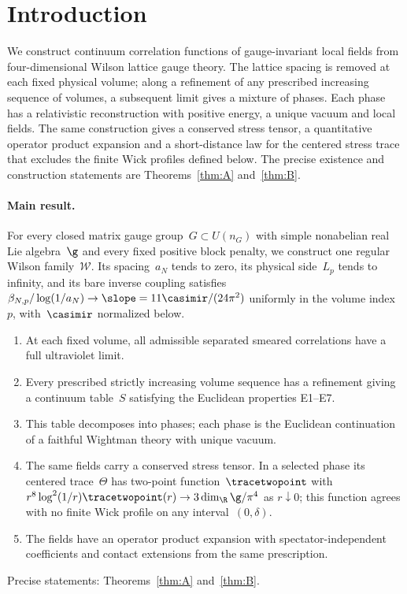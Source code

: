 \section{Introduction}\label{sec:introduction}

We construct continuum correlation functions of gauge-invariant local fields from four-dimensional Wilson lattice gauge theory. The lattice spacing is removed at each fixed physical volume; along a refinement of any prescribed increasing sequence of volumes, a subsequent limit gives a mixture of phases. Each phase has a relativistic reconstruction with positive energy, a unique vacuum and local fields. The same construction gives a conserved stress tensor, a quantitative operator product expansion and a short-distance law for the centered stress trace that excludes the finite Wick profiles defined below. The precise existence and construction statements are Theorems~\ref{thm:A} and~\ref{thm:B}.

\paragraph{Main result.}
For every closed matrix gauge group~$G\subset U(n_G)$ with simple nonabelian real Lie algebra~$\g$ and every fixed positive block penalty, we construct one regular Wilson family~$\mathcal W$. Its spacing~$a_N$ tends to zero, its physical side~$L_p$ tends to infinity, and its bare inverse coupling satisfies $\beta_{N,p}/\log(1/a_N)\to\slope=11\casimir/(24\pi^2)$ uniformly in the volume index~$p$, with~$\casimir$ normalized below.
\begin{enumerate}[label=\textup{(\roman*)},nosep]
\item At each fixed volume, all admissible separated smeared correlations have a full ultraviolet limit.
\item Every prescribed strictly increasing volume sequence has a refinement giving a continuum table~$S$ satisfying the Euclidean properties E1--E7.
\item This table decomposes into phases; each phase is the Euclidean continuation of a faithful Wightman theory with unique vacuum.
\item The same fields carry a conserved stress tensor. In a selected phase its centered trace~$\Theta$ has two-point function~$\tracetwopoint$ with $r^8\log^2(1/r)\tracetwopoint(r)\to3\dim_\R\g/\pi^4$ as $r\downarrow0$; this function agrees with no finite Wick profile on any interval~$(0,\delta)$.
\item The fields have an operator product expansion with spectator-independent coefficients and contact extensions from the same prescription.
\end{enumerate}
Precise statements: Theorems~\ref{thm:A} and~\ref{thm:B}.

